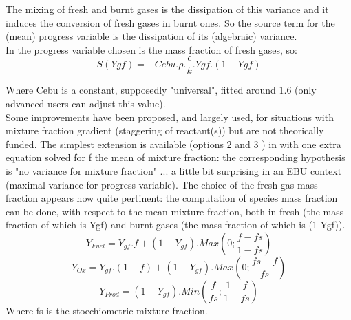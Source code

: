 The mixing of fresh and burnt gases is the dissipation of this
variance and it induces the conversion of fresh gases in burnt
ones. So the source term for the ({\small mean}) progress variable is
the dissipation of its ({\small algebraic}) variance.\\

In \CS the progress variable chosen is the mass fraction of fresh
gases, so:\\
\begin{equation}
S(Ygf) = - Cebu . \rho . \frac{\epsilon}{k} . Ygf . (1-Ygf)
\end{equation}

Where Cebu is a constant, supposedly "universal", fitted around 1.6
({\small only advanced users can adjust this value}).\\


Some improvements have been proposed, and largely used, for situations
with mixture fraction gradient ({\small staggering of reactant(s)})
but are not theorically funded. The simplest extension is available
({\small options 2 and 3 }) in \CS with one extra equation solved for
f the mean of mixture fraction: the corresponding hypothesis is "no
variance for mixture fraction" ... a little bit surprising in an EBU
context ({\small maximal variance for progress variable}). The choice
of the fresh gas mass fraction appears now quite pertinent: the
computation of species mass fraction can be done, with respect to the
mean mixture fraction, both in fresh ({\small the mass fraction of
which is Ygf}) and burnt gases ({\small the mass fraction of which is
(1-Ygf)}).\\
\begin{equation}
Y_{Fuel} = Y_{gf}.f + (1-Y_{gf}) . Max(0 ; \frac{f-fs}{1-fs})
\end{equation}
\begin{equation}
Y_{Ox} = Y_{gf}.(1-f) + (1-Y_{gf}) . Max(0 ; \frac{fs-f}{fs})
\end{equation}
\begin{equation}
Y_{Prod} = (1-Y_{gf}) . Min( \frac{f}{fs} ; \frac{1-f}{1-fs} )
\end{equation}
Where fs is the stoechiometric mixture fraction.\\

